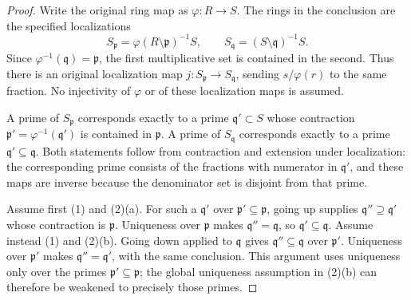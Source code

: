 \begin{proof}
Write the original ring map as $\varphi:R\to S$.
The rings in the conclusion are the specified
localizations
$$
S_{\mathfrak p}=\varphi(R\setminus\mathfrak p)^{-1}S,
\qquad S_{\mathfrak q}=(S\setminus\mathfrak q)^{-1}S.
$$
Since $\varphi^{-1}(\mathfrak q)=\mathfrak p$,
the first multiplicative set is contained in the
second. Thus there is an original localization map
$j:S_{\mathfrak p}\to S_{\mathfrak q}$, sending
$s/\varphi(r)$ to the same fraction.
No injectivity of $\varphi$ or of these localization
maps is assumed.

A prime of $S_{\mathfrak p}$ corresponds exactly
to a prime $\mathfrak q'\subset S$ whose contraction
$\mathfrak p'=\varphi^{-1}(\mathfrak q')$ is contained
in $\mathfrak p$. A prime of $S_{\mathfrak q}$
corresponds exactly to a prime
$\mathfrak q'\subseteq\mathfrak q$. Both statements
follow from contraction and extension under
localization: the corresponding prime consists of
the fractions with numerator in $\mathfrak q'$,
and these maps are inverse because the denominator
set is disjoint from that prime.

Assume first (1) and (2)(a). For such a
$\mathfrak q'$ over $\mathfrak p'\subseteq\mathfrak p$,
going up supplies $\mathfrak q''\supseteq\mathfrak q'$
whose contraction is $\mathfrak p$. Uniqueness over
$\mathfrak p$ makes $\mathfrak q''=\mathfrak q$,
so $\mathfrak q'\subseteq\mathfrak q$.
Assume instead (1) and (2)(b). Going down applied
to $\mathfrak q$ gives
$\mathfrak q''\subseteq\mathfrak q$ over
$\mathfrak p'$. Uniqueness over $\mathfrak p'$
makes $\mathfrak q''=\mathfrak q'$, with the same
conclusion. This argument uses uniqueness only
over the primes $\mathfrak p'\subseteq\mathfrak p$;
the global uniqueness assumption in (2)(b) can
therefore be weakened to precisely those primes.


\end{proof}
